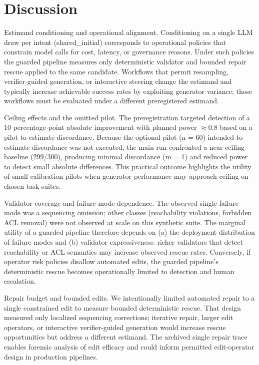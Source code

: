\documentclass[conference]{IEEEtran}
\begin{document}
\section{Discussion}
Estimand conditioning and operational alignment. Conditioning on a single LLM draw per intent (shared\_initial) corresponds to operational policies that constrain model calls for cost, latency, or governance reasons. Under such policies the guarded pipeline measures only deterministic validator and bounded repair rescue applied to the same candidate. Workflows that permit resampling, verifier‑guided generation, or interactive steering change the estimand and typically increase achievable success rates by exploiting generator variance; those workflows must be evaluated under a different preregistered estimand.

Ceiling effects and the omitted pilot. The preregistration targeted detection of a 10 percentage‑point absolute improvement with planned power \ensuremath{\approx}0.8 based on a pilot to estimate discordance. Because the optional pilot (n = 60) intended to estimate discordance was not executed, the main run confronted a near‑ceiling baseline (299/300), producing minimal discordance (m = 1) and reduced power to detect small absolute differences. This practical outcome highlights the utility of small calibration pilots when generator performance may approach ceiling on chosen task suites.

Validator coverage and failure‑mode dependence. The observed single failure mode was a sequencing omission; other classes (reachability violations, forbidden ACL removal) were not observed at scale on this synthetic suite. The marginal utility of a guarded pipeline therefore depends on (a) the deployment distribution of failure modes and (b) validator expressiveness: richer validators that detect reachability or ACL semantics may increase observed rescue rates. Conversely, if operator risk policies disallow automated edits, the guarded pipeline's deterministic rescue becomes operationally limited to detection and human escalation.

Repair budget and bounded edits. We intentionally limited automated repair to a single constrained edit to measure bounded deterministic rescue. That design measured only localized sequencing corrections; iterative repair, larger edit operators, or interactive verifier‑guided generation would increase rescue opportunities but address a different estimand. The archived single repair trace enables forensic analysis of edit efficacy and could inform permitted edit‑operator design in production pipelines.
\end{document}
